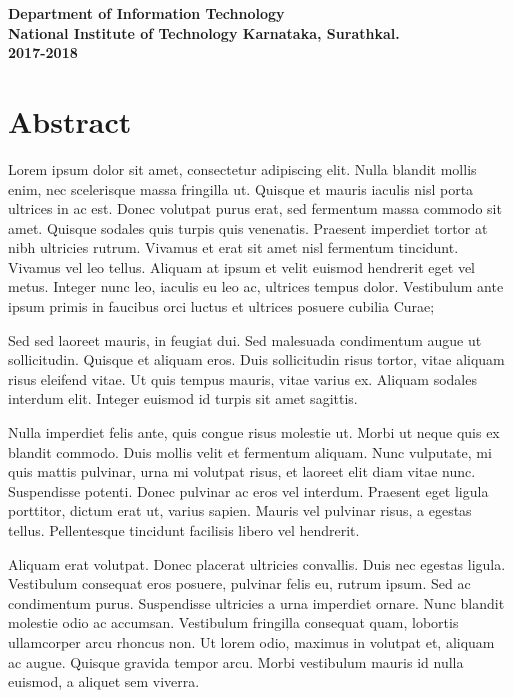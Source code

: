 \documentclass{article}[12pt,a4paper]
\begin{document}
\begin{titlepage}
\begin{figure}[!ht]
    \end{figure}
    \vspace{2em}
    {\Large \bfseries Department of Information Technology}\\
    \vspace{0.5em}
    {\Large \bfseries National Institute of Technology Karnataka, Surathkal.}\\
    \vspace{0.5em}
    {\Large \bfseries 2017-2018}
\end{titlepage}

\section*{Abstract}


Lorem ipsum dolor sit amet, consectetur adipiscing elit. 
Nulla blandit mollis enim, nec scelerisque massa fringilla ut. 
Quisque et mauris iaculis nisl porta ultrices in ac est. 
Donec volutpat purus erat, sed fermentum massa commodo sit amet. 
Quisque sodales quis turpis quis venenatis. 
Praesent imperdiet tortor at nibh ultricies rutrum. 
Vivamus et erat sit amet nisl fermentum tincidunt. 
Vivamus vel leo tellus. 
Aliquam at ipsum et velit euismod hendrerit eget vel metus. 
Integer nunc leo, iaculis eu leo ac, ultrices tempus dolor. 
Vestibulum ante ipsum primis in faucibus orci luctus et ultrices posuere 
cubilia Curae;

Sed sed laoreet mauris, in feugiat dui. 
Sed malesuada condimentum augue ut sollicitudin. 
Quisque et aliquam eros. 
Duis sollicitudin risus tortor, vitae aliquam risus eleifend vitae. 
Ut quis tempus mauris, vitae varius ex. 
Aliquam sodales interdum elit. 
Integer euismod id turpis sit amet sagittis.

Nulla imperdiet felis ante, quis congue risus molestie ut. 
Morbi ut neque quis ex blandit commodo. 
Duis mollis velit et fermentum aliquam. 
Nunc vulputate, mi quis mattis pulvinar, urna mi volutpat risus, 
et laoreet elit diam vitae nunc. Suspendisse potenti. 
Donec pulvinar ac eros vel interdum. 
Praesent eget ligula porttitor, dictum erat ut, varius sapien. 
Mauris vel pulvinar risus, a egestas tellus. 
Pellentesque tincidunt facilisis libero vel hendrerit.

Aliquam erat volutpat. 
Donec placerat ultricies convallis. 
Duis nec egestas ligula. 
Vestibulum consequat eros posuere, pulvinar felis eu, rutrum ipsum. 
Sed ac condimentum purus. 
Suspendisse ultricies a urna imperdiet ornare. 
Nunc blandit molestie odio ac accumsan. 
Vestibulum fringilla consequat quam, lobortis ullamcorper arcu rhoncus non. 
Ut lorem odio, maximus in volutpat et, aliquam ac augue. 
Quisque gravida tempor arcu. 
Morbi vestibulum mauris id nulla euismod, a aliquet sem viverra.
\end{document}
